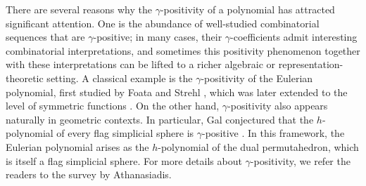 \documentclass[reqno]{amsart}
\theoremstyle{definition}
\theoremstyle{remark}
\begin{document}
There are several reasons why the $\gamma$-positivity of a polynomial has attracted significant attention. One is the abundance of well-studied combinatorial sequences that are $\gamma$-positive; in many cases, their $\gamma$-coefficients admit interesting combinatorial interpretations, and sometimes this positivity phenomenon together with these interpretations can be lifted to a richer algebraic or representation-theoretic setting. A classical example is the $\gamma$-positivity of the Eulerian polynomial, first studied by Foata and Strehl \cite{FoataStrehl1974}, which was later extended to the level of symmetric functions \cite{ShareshianWachs2010,ShareshianWachs2020}.
On the other hand, $\gamma$-positivity also appears naturally in geometric contexts. In particular, Gal conjectured that the $h$-polynomial of every flag simplicial sphere is $\gamma$-positive \cite[Conjecture 2.1.7]{Gal2005}.
In this framework, the Eulerian polynomial arises as the $h$-polynomial of the dual permutahedron, which is itself a flag simplicial sphere.
For more details about $\gamma$-positivity, we refer the readers to the survey \cite{AthanasiadisGamma} by Athanasiadis.
\end{document}
